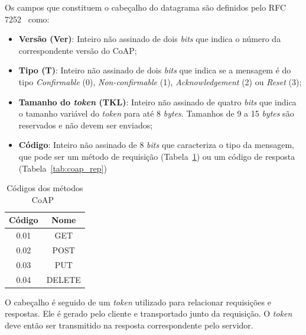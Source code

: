 Os campos que constituem o cabeçalho do datagrama são definidos pelo RFC 7252~\cite{shelby2014constrained} como:

\begin{itemize}
	\item \textbf{Versão (Ver)}: Inteiro não assinado de dois \textit{bits} que indica o número da correspondente versão do CoAP;
	\item \textbf{Tipo (T)}: Inteiro não assinado de dois \textit{bits} que indica se a mensagem é do tipo \textit{Confirmable} (0), \textit{Non-confirmable} (1), \textit{Acknowledgement} (2) ou \textit{Reset} (3);
	\item \textbf{Tamanho do \textit{token} (TKL)}: Inteiro não assinado de quatro \textit{bits} que indica o tamanho variável do \textit{token} para até 8 \textit{bytes}. Tamanhos de 9 a 15 \textit{bytes} são reservados e não devem ser enviados;
	\item \textbf{Código}: Inteiro não assinado de 8 \textit{bits} que caracteriza o tipo da mensagem, que pode ser um método de requisição (Tabela~\ref{tab:coap_met}) ou um código de resposta (Tabela~\ref{tab:coap_rep})   
\end{itemize}

\begin{table}[!ht]
	\centering\tiny{
	\caption{Códigos dos métodos CoAP~\cite{shelby2014constrained} \label{tab:coap_met}}
	\begin{tabular}{|c|c|}
		\hline
		\textbf{Código} & \textbf{Nome} \\ \hline
		0.01       &      GET      \\ \hline
		0.02       &     POST      \\ \hline
		0.03       &      PUT      \\ \hline
		0.04       &    DELETE     \\ \hline
	\end{tabular}
}
\end{table}

O cabeçalho é seguido de um \textit{token} utilizado para relacionar requisições e respostas. Ele é gerado pelo cliente e transportado junto da requisição. O \textit{token} deve então ser transmitido na resposta correspondente pelo servidor.

